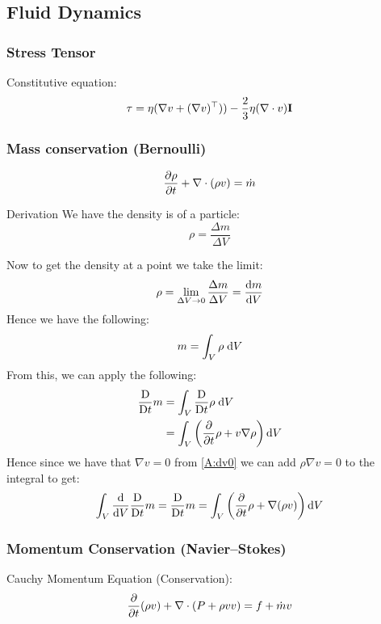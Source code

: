 \documentclass[main.tex]{subfiles}
\begin{document}
\subsection{Fluid Dynamics}
\subsubsection{Stress Tensor}
Constitutive equation:
\begin{equation}
    \tau = \eta(\nabla v + (\nabla v)^\top)) - \frac{2}{3}\eta(\nabla\cdot v)\mathbf{I}
    \label{eq:tau}
\end{equation}

\subsubsection{Mass conservation (Bernoulli)}
\begin{equation}
    \frac{\partial \rho}{\partial t} + \nabla \cdot (\rho v) = \dot{m}
    \label{eq:bernoulli}
\end{equation}

\cite{rienstra_introduction_nodate}

Derivation
We have the density is of a particle:
$$\rho = \frac{\Delta m}{\Delta V}$$

Now to get the density at a point we take the limit:
\begin{align*}
    \rho = \lim_{\Delta V \to 0}\frac{\Delta m}{\Delta V} = \frac{\text{d} m}{\text{d} V}
\end{align*}
Hence we have the following:
\begin{align*}
    m = \int_V \rho \;\text{d} V
\end{align*}
From this, we can apply the following:
\begin{align*}
    \frac{\text{D} }{\text{D} t}m &= \int_V \frac{\text{D} }{\text{D} t} \rho \; \text{d} V \\
    &= \int_V \left(\frac{\partial }{\partial t}\rho + v\nabla \rho\right)\text{d} V
\end{align*}
Hence since we have that $\nabla v = 0$ from \autoref{A:dv0} we can add $\rho\nabla v = 0$ to the integral to get:
$$\int_{V}\frac{\text{d}}{\text{d}V}\frac{\text{D} }{\text{D} t} m = \frac{\text{D} }{\text{D} t}m = \int_V \left(\frac{\partial }{\partial t}\rho + \nabla(\rho v)\right)\text{d} V$$

\subsubsection{Momentum Conservation (Navier–Stokes)}
Cauchy Momentum Equation (Conservation):
\begin{equation}
    \frac{\partial }{\partial t}(\rho v) + \nabla\cdot (P + \rho vv) = f + \dot{m}v
    \label{eq:Nav-Stok}
\end{equation}
\end{document}
